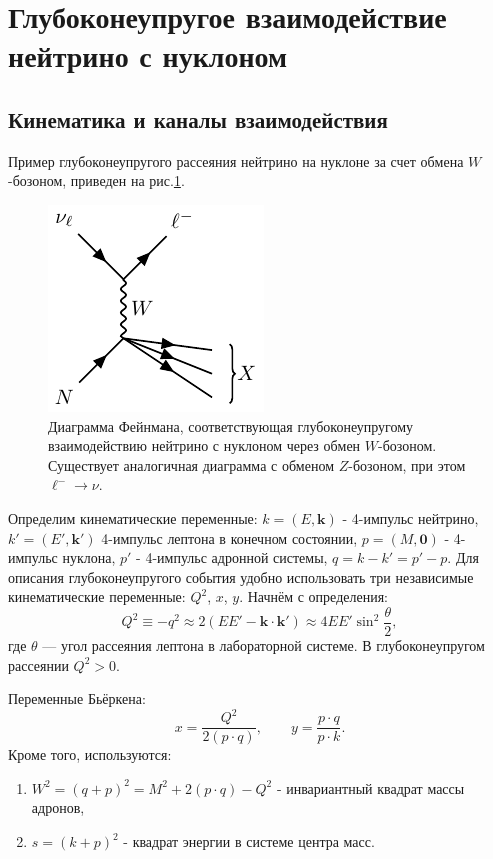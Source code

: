 \section{Глубоконеупругое взаимодействие нейтрино с нуклоном}
\subsection{Кинематика и каналы взаимодействия}
Пример глубоконеупругого рассеяния нейтрино  на нуклоне за счет обмена $W$-бозоном, приведен на рис.\ref{fig:DIS}.
\begin{figure}[!h]
\centering
\includegraphics[width=0.4\linewidth]{images/neutrino-nucleon-dis.pdf}
\caption{Диаграмма Фейнмана, соответствующая глубоконеупругому взаимодействию нейтрино с нуклоном через обмен $W$-бозоном.  Существует аналогичная диаграмма с обменом  $Z$-бозоном, при этом $\ell^-\to \nu$.}
\label{fig:DIS}
\end{figure}
Определим кинематические переменные: $k = (E, \bm{k})$ - 4-импульс нейтрино, $k' = (E', \bm{k}')$ 4-импульс  лептона в  конечном состоянии, $p=(M,\bm{0})$ - 4-импульс нуклона, $p'$ - 4-импульс  адронной системы, $q = k-k' = p'-p$. 
Для описания глубоконеупругого события удобно использовать три независимые кинематические переменные: \( Q^2 \), \( x \), \( y \).
Начнём с определения:
\begin{equation}
  Q^2 \equiv -q^2 \approx 2 (EE' - \bm{k} \cdot \bm{k}') \approx 4EE' \sin^2\frac{\theta}{2},
\end{equation}
где \( \theta \) — угол рассеяния лептона в лабораторной системе. В глубоконеупругом рассеянии \( Q^2 > 0 \).

Переменные Бьёркена:
\begin{equation}
  x = \frac{Q^2}{2(p \cdot q)}, \qquad y = \frac{p \cdot q}{p \cdot k}.
\end{equation}
Кроме того, используются: 
\begin{enumerate}
\item $W^2 = (q+p)^2 = M^2+2 (p\cdot q) -Q^2$ - инвариантный квадрат массы адронов,
\item $s = (k+p)^2$ - квадрат энергии в системе центра масс.
\end{enumerate}

